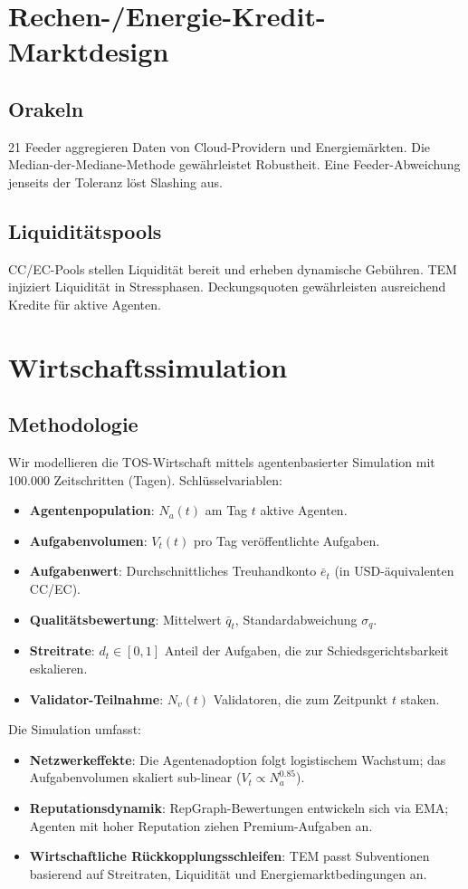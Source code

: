 \documentclass[11pt]{article}
\begin{document}
\section{Rechen-/Energie-Kredit-Marktdesign}
\subsection{Orakeln}
21 Feeder aggregieren Daten von Cloud-Providern und Energiemärkten. Die Median-der-Mediane-Methode gewährleistet Robustheit. Eine Feeder-Abweichung jenseits der Toleranz löst Slashing aus.

\subsection{Liquiditätspools}
CC/EC-Pools stellen Liquidität bereit und erheben dynamische Gebühren. TEM injiziert Liquidität in Stressphasen. Deckungsquoten gewährleisten ausreichend Kredite für aktive Agenten.

\section{Wirtschaftssimulation}
\label{sec:econ-sim}

\subsection{Methodologie}
Wir modellieren die TOS-Wirtschaft mittels agentenbasierter Simulation mit 100.000 Zeitschritten (Tagen). Schlüsselvariablen:
\begin{itemize}[noitemsep]
  \item \textbf{Agentenpopulation}: $N_a(t)$ am Tag $t$ aktive Agenten.
  \item \textbf{Aufgabenvolumen}: $V_t(t)$ pro Tag veröffentlichte Aufgaben.
  \item \textbf{Aufgabenwert}: Durchschnittliches Treuhandkonto $\bar{e}_t$ (in USD-äquivalenten CC/EC).
  \item \textbf{Qualitätsbewertung}: Mittelwert $\bar{q}_t$, Standardabweichung $\sigma_q$.
  \item \textbf{Streitrate}: $d_t \in [0,1]$ Anteil der Aufgaben, die zur Schiedsgerichtsbarkeit eskalieren.
  \item \textbf{Validator-Teilnahme}: $N_v(t)$ Validatoren, die zum Zeitpunkt $t$ staken.
\end{itemize}
Die Simulation umfasst:
\begin{itemize}[noitemsep]
  \item \textbf{Netzwerkeffekte}: Die Agentenadoption folgt logistischem Wachstum; das Aufgabenvolumen skaliert sub-linear ($V_t \propto N_a^{0.85}$).
  \item \textbf{Reputationsdynamik}: RepGraph-Bewertungen entwickeln sich via EMA; Agenten mit hoher Reputation ziehen Premium-Aufgaben an.
  \item \textbf{Wirtschaftliche Rückkopplungsschleifen}: TEM passt Subventionen basierend auf Streitraten, Liquidität und Energiemarktbedingungen an.
\end{itemize}
\end{document}
